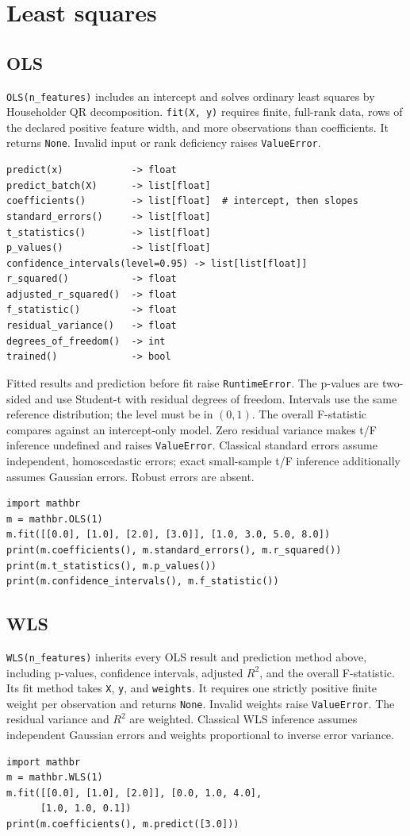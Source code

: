 \documentclass[11pt,a4paper]{article}
\begin{document}
\section{Least squares}
\subsection{OLS}
\verb|OLS(n_features)| includes an intercept and solves ordinary least squares by Householder QR decomposition. \verb|fit(X, y)| requires finite, full-rank data, rows of the declared positive feature width, and more observations than coefficients. It returns \verb|None|. Invalid input or rank deficiency raises \verb|ValueError|.
\begin{verbatim}
predict(x)            -> float
predict_batch(X)      -> list[float]
coefficients()        -> list[float]  # intercept, then slopes
standard_errors()     -> list[float]
t_statistics()        -> list[float]
p_values()            -> list[float]
confidence_intervals(level=0.95) -> list[list[float]]
r_squared()           -> float
adjusted_r_squared()  -> float
f_statistic()         -> float
residual_variance()   -> float
degrees_of_freedom()  -> int
trained()             -> bool
\end{verbatim}
Fitted results and prediction before fit raise \verb|RuntimeError|. The p-values are two-sided and use Student-t with residual degrees of freedom. Intervals use the same reference distribution; the level must be in $(0,1)$. The overall F-statistic compares against an intercept-only model. Zero residual variance makes t/F inference undefined and raises \verb|ValueError|. Classical standard errors assume independent, homoscedastic errors; exact small-sample t/F inference additionally assumes Gaussian errors. Robust errors are absent.
\begin{verbatim}
import mathbr
m = mathbr.OLS(1)
m.fit([[0.0], [1.0], [2.0], [3.0]], [1.0, 3.0, 5.0, 8.0])
print(m.coefficients(), m.standard_errors(), m.r_squared())
print(m.t_statistics(), m.p_values())
print(m.confidence_intervals(), m.f_statistic())
\end{verbatim}

\subsection{WLS}
\verb|WLS(n_features)| inherits every OLS result and prediction method above, including p-values, confidence intervals, adjusted $R^2$, and the overall F-statistic. Its fit method takes \verb|X|, \verb|y|, and \verb|weights|. It requires one strictly positive finite weight per observation and returns \verb|None|. Invalid weights raise \verb|ValueError|. The residual variance and $R^2$ are weighted. Classical WLS inference assumes independent Gaussian errors and weights proportional to inverse error variance.
\begin{verbatim}
import mathbr
m = mathbr.WLS(1)
m.fit([[0.0], [1.0], [2.0]], [0.0, 1.0, 4.0],
      [1.0, 1.0, 0.1])
print(m.coefficients(), m.predict([3.0]))
\end{verbatim}
\end{document}
